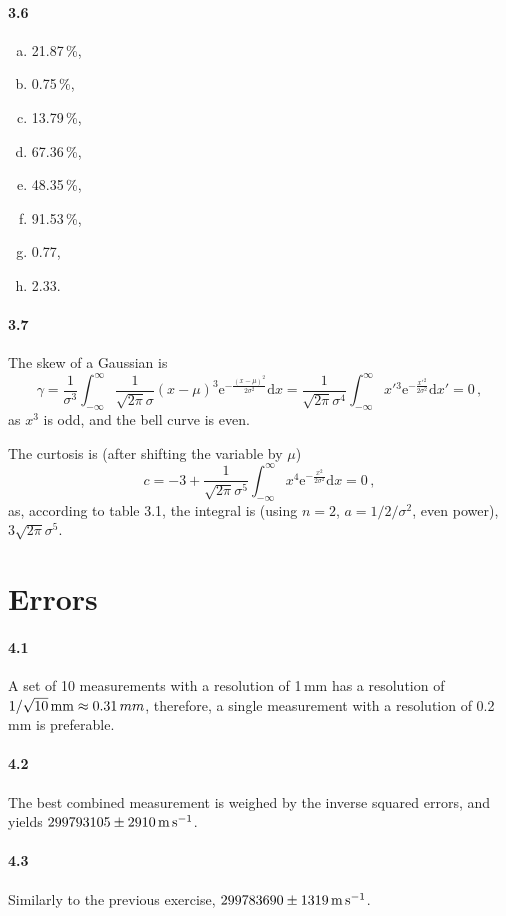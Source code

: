 \documentclass[a4paper,12pt]{article}
\def\d{\mathrm{d}}
\def\e{\mathrm{e}}
\begin{document}
\paragraph{3.6}
\begin{enumerate}[(a)]
 \item 21.87\,\%,
 \item 0.75\,\%,
 \item 13.79\,\%,
 \item 67.36\,\%,
 \item 48.35\,\%,
 \item 91.53\,\%,
 \item 0.77,
 \item 2.33.
\end{enumerate}

\paragraph{3.7} The skew of a Gaussian is
\[
 \gamma = \frac{1}{\sigma^3}\int_{-\infty}^\infty \frac{1}{\sqrt{2\pi}\sigma}(x-\mu)^3 \e^{-\frac{(x-\mu)^2}{2\sigma^2}}\d x = \frac{1}{\sqrt{2\pi}\sigma^4}\int_{-\infty}^\infty x'{}^3 \e^{-\frac{x'{}^2}{2\sigma^2}}\d x' = 0\,,
\]
as $x^3$ is odd, and the bell curve is even.

The curtosis is (after shifting the variable by $\mu$)
\[
 c = -3+\frac{1}{\sqrt{2\pi}\sigma^5}\int_{-\infty}^\infty x^4 \e^{-\frac{x^2}{2\sigma^2}}\d x=0\,,
\]
as, according to table 3.1, the integral is (using $n=2$, $a=1/2/\sigma^2$, even power), $3\sqrt{2\pi}\sigma^5$.

\section{Errors}

\paragraph{4.1} A set of 10 measurements with a resolution of 1\,mm has a resolution of $1/\sqrt{10}\,{\rm mm}\approx 0.31\,mm$, therefore, a single measurement with a resolution of 0.2\,mm is preferable.

\paragraph{4.2} The best combined measurement is weighed by the inverse squared errors, and yields
$299793105 \pm 2910\,{\rm m\,s}^{-1}$.

\paragraph{4.3} Similarly to the previous exercise, $299783690\pm 1319\,{\rm m\,s}^{-1}$.
\end{document}
